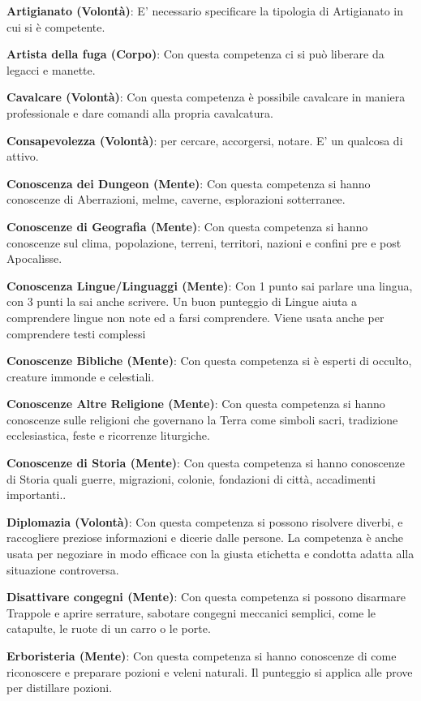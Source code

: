 \documentclass[12pt,a4paper,twoside,openany]{book}
\begin{document}
\begin{multicols}{2}
\textbf{Artigianato (Volontà)}: E' necessario specificare la tipologia di Artigianato in cui si è competente.

\textbf{Artista della fuga (Corpo)}: Con questa competenza ci si può liberare da legacci e manette.

\textbf{Cavalcare (Volontà)}: Con questa competenza è possibile cavalcare in maniera professionale e dare comandi alla propria cavalcatura. 

\textbf{Consapevolezza (Volontà)}: per cercare, accorgersi, notare. E' un qualcosa di attivo.

\textbf{Conoscenza dei Dungeon (Mente)}: Con questa competenza si hanno conoscenze di Aberrazioni, melme, caverne, esplorazioni sotterranee.

\textbf{Conoscenze di Geografia (Mente)}: Con questa competenza si hanno conoscenze sul clima, popolazione, terreni, territori, nazioni e confini pre e post Apocalisse.

\textbf{Conoscenza Lingue/Linguaggi (Mente)}: Con 1 punto sai parlare una lingua, con 3 punti la sai anche scrivere. Un buon punteggio di Lingue aiuta a comprendere lingue non note ed a farsi comprendere. Viene usata anche per comprendere testi complessi

\textbf{Conoscenze Bibliche (Mente)}: Con questa competenza si è esperti di occulto, creature immonde e celestiali. 

\textbf{Conoscenze Altre Religione (Mente)}: Con questa competenza si hanno conoscenze sulle religioni che governano la Terra come simboli sacri, tradizione ecclesiastica, feste e ricorrenze liturgiche. 

\textbf{Conoscenze di Storia (Mente)}: Con questa competenza si hanno conoscenze di Storia quali guerre, migrazioni, colonie, fondazioni di città, accadimenti importanti..

\textbf{Diplomazia (Volontà)}: Con questa competenza si possono risolvere diverbi, e raccogliere preziose informazioni e dicerie dalle persone. La competenza è anche usata per negoziare in modo efficace con la giusta etichetta e condotta adatta alla situazione controversa. 

\textbf{Disattivare congegni (Mente)}: Con questa competenza si possono disarmare Trappole e aprire serrature, sabotare congegni meccanici semplici, come le catapulte, le ruote di un carro o le porte.

\textbf{Erboristeria (Mente)}: Con questa competenza si hanno conoscenze di come riconoscere e preparare pozioni e veleni naturali. Il punteggio si applica alle prove per distillare pozioni.


\end{multicols}
\end{document}

